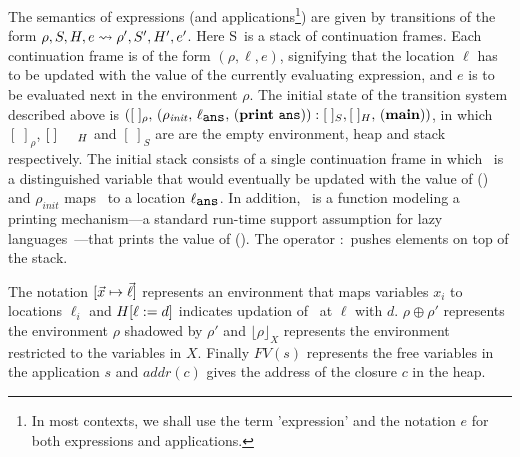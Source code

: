 \documentclass[preprint, 9pt]{sigplanconf}
\newcommand{\warning}[1]{{\color{Myred}{#1}}}
\def\myvec{\mathaccent"017E }
\newcommand{\stk}{{S}}
\begin{document}
The  semantics  of   expressions  (and  applications\footnote{In  most
 contexts, we  shall use the  term 'expression' and the  notation $e$
  for both expressions and applications.}) 
are given by transitions of the form $\rho, \stk, \heap, e \rightsquigarrow
\rho',  \stk', \heap',  e'$.  Here  \stk\ is  a stack  of continuation
frames.  Each  continuation frame  is of the  form $(\rho,  \ell, e)$,
signifying that the  location $\ell$ has to be updated  with the value
of the  currently evaluating  expression, and $e$  is to  be evaluated
next  in the  environment $\rho$.  
The  initial  state  of  the  transition  system  described  above  is
$([\;]_\rho,\,    (\rho_\mathit{init},   \, \ell_{\mathbf{\mbox{\tt ans}}}  ,\,
(\mathbf{print}~\mathbf{\mbox{\tt ans}})):[\;]_{S}, 
[\;]_{H},\, (\mathbf{main}))$,  in which  $[\;]_\rho$,
$[\;]_{\mbox \footnotesize {H}}$
and $[\;]_{S}$ are    are the
empty environment, heap and stack respectively. The  initial stack consists
of  a single  continuation frame  in  which \ans\  is a  distinguished
variable  that  would   eventually  be  updated  with   the  value  of
(\mainpgm) and $\rho_\mathit{init}$ maps \ans\ to a location $\ell_{\mathbf{\mbox{\tt ans}}}$.   In  addition, \print\ is  a function modeling  a printing
mechanism---a   standard   run-time   support  assumption   for   lazy
languages~\cite{Jones87}---that prints  the value of  (\mainpgm).  The operator $:$
pushes elements on top of the stack.

The   notation  $[\myvec{x}   \mapsto  \myvec{\ell}]$   represents  an
environment  that  maps  variables  $x_i$ to  locations  $\ell_i$  and
$H[\ell := d]$  indicates updation of  \heap\ at $\ell$
with  $d$.   $\rho \oplus  \rho'$  represents  the environment  $\rho$
shadowed  by  $\rho'$  and  $\lfloor \rho  \rfloor_X$  represents  the
environment  restricted  to  the  variables in  $X$.  Finally  $FV(s)$
represents the  free variables  in the  application $s$  and $addr(c)$
gives the address of the closure $c$ in the heap.
\end{document}
